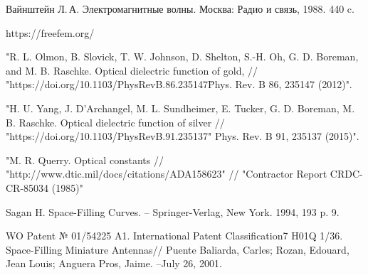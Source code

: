 \documentclass[%
specialist,  %
subf,        %
href,        %
colorlinks,  %
]{disser}
\begin{document}
\begin{thebibliography}{99}
	Вайнштейн Л.\,А. {Электромагнитные волны}. Москва: Радио и связь, 1988. 440 c.
	
 https://freefem.org/
	
 "R. L. Olmon, B. Slovick, T. W. Johnson, D. Shelton, S.-H. Oh, G. D. Boreman, and M. B. Raschke. Optical dielectric function of gold, // "https://doi.org/10.1103/PhysRevB.86.235147\" Phys. Rev. B 86, 235147 (2012)".
	
"H. U. Yang, J. D'Archangel, M. L. Sundheimer, E. Tucker, G. D. Boreman, M. B. Raschke. Optical dielectric function of silver // "https://doi.org/10.1103/PhysRevB.91.235137" Phys. Rev. B 91, 235137 (2015)".
	
"M. R. Querry. Optical constants //  "http://www.dtic.mil/docs/citations/ADA158623" // "Contractor Report CRDC-CR-85034 (1985)"
	
 Sagan H. Space-Filling Curves. – Springer-Verlag, New York. 1994, 193 p. 9. 

 WO Patent № 01/54225 A1. International Patent Classification7 H01Q 1/36. Space-Filling Miniature Antennas// Puente Baliarda, Carles; Rozan, Edouard, Jean Louis; Anguera Pros, Jaime. –July 26, 2001.
	
\end{thebibliography}
\end{document}
